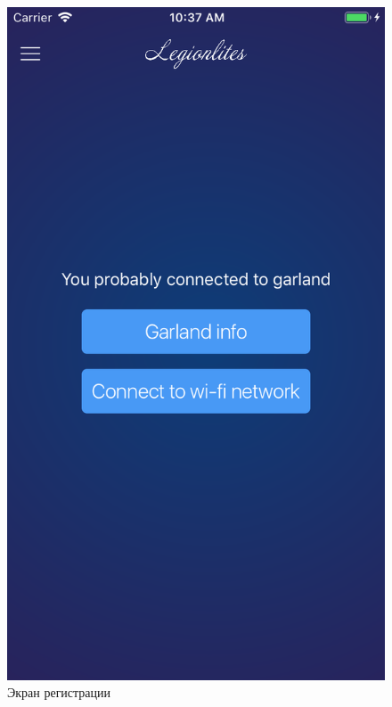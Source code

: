 ~
\begin{figure}[H]
\centering
	\includegraphics[scale=0.2]{figures/userGuide/device.png}
	\caption{Экран регистрации}
	\label{fig:develop:userGuide:device}
\end{figure}
~
